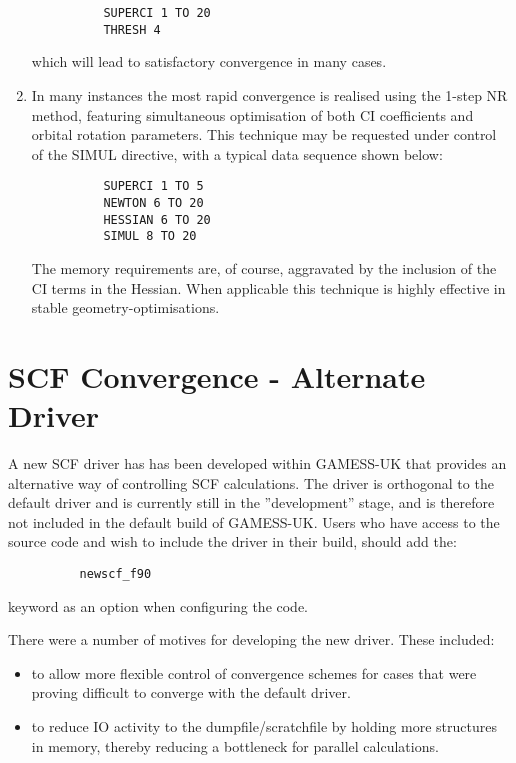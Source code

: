 \documentclass[11pt,fleqn]{article}
\begin{document}
\begin{enumerate}
{
\footnotesize
\begin{verbatim}
          SUPERCI 1 TO 20
          THRESH 4
\end{verbatim}
}
which will lead to satisfactory convergence in many cases.
\item  In many instances the most rapid convergence is realised using
the 1-step NR method, featuring simultaneous optimisation of both CI
coefficients and orbital rotation parameters. This technique may be
requested under control of the SIMUL directive, with a typical
data sequence shown below:

{
\footnotesize
\begin{verbatim}
          SUPERCI 1 TO 5
          NEWTON 6 TO 20
          HESSIAN 6 TO 20
          SIMUL 8 TO 20
\end{verbatim}
}
The memory requirements are, of course, aggravated by the inclusion of the
CI terms in the Hessian. When applicable this technique is highly
effective in stable geometry-optimisations.

\end{enumerate}

\section[SCF Convergence - Alternate Driver]{SCF Convergence -  Alternate Driver} 

A new SCF driver has has been developed within GAMESS-UK that
provides an alternative way of controlling SCF calculations. The
driver is orthogonal to the default driver and is currently still in
the ''development'' stage, and is therefore not included in the default
build of GAMESS-UK. Users who have access to the source code and
wish to include the driver in their build, should add the:

{
\footnotesize
\begin{verbatim}
          newscf_f90
\end{verbatim}
}

keyword as an option when configuring the code.

There were a number of motives for developing the new driver. These
included:

\begin{itemize}

\item to allow more flexible control of convergence schemes for cases
  that were proving difficult to converge with the default driver.
\item to reduce IO activity to the dumpfile/scratchfile by holding
  more structures in memory, thereby reducing a bottleneck for
  parallel calculations.
\end{itemize}
\end{document}

